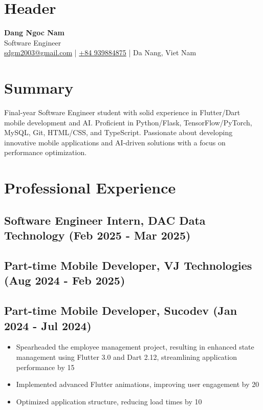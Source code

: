 \documentclass[a4paper,10pt]{article}
\begin{document}
\section*{Header}
\begin{center}
{\LARGE \textbf{Dang Ngoc Nam}} \\
Software Engineer \\
\href{mailto:sdgm2003@gmail.com}{sdgm2003@gmail.com} | \href{tel:+84 939884875}{+84 939884875} | Da Nang, Viet Nam
\end{center}
\section*{Summary}
Final-year Software Engineer student with solid experience in Flutter/Dart mobile development and AI. Proficient in Python/Flask, TensorFlow/PyTorch, MySQL, Git, HTML/CSS, and TypeScript. Passionate about developing innovative mobile applications and AI-driven solutions with a focus on performance optimization.
\section*{Professional Experience}
\subsection*{Software Engineer Intern, DAC Data Technology (Feb 2025 - Mar 2025)}
\begin{itemize}
\end{itemize}
\subsection*{Part-time Mobile Developer, VJ Technologies (Aug 2024 - Feb 2025)}
\begin{itemize}
\end{itemize}
\subsection*{Part-time Mobile Developer, Sucodev (Jan 2024 - Jul 2024)}
\begin{itemize}
    \item Spearheaded the employee management project, resulting in enhanced state management using Flutter 3.0 and Dart 2.12, streamlining application performance by 15%
    \item Implemented advanced Flutter animations, improving user engagement by 20%
    \item Optimized application structure, reducing load times by 10%
\end{itemize}
\end{document}

